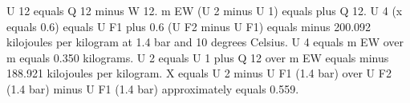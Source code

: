 U 12 equals Q 12 minus W 12. m EW (U 2 minus U 1) equals plus Q 12. U 4 (x equals 0.6) equals U F1 plus 0.6 (U F2 minus U F1) equals minus 200.092 kilojoules per kilogram at 1.4 bar and 10 degrees Celsius. U 4 equals m EW over m equals 0.350 kilograms. U 2 equals U 1 plus Q 12 over m EW equals minus 188.921 kilojoules per kilogram. X equals U 2 minus U F1 (1.4 bar) over U F2 (1.4 bar) minus U F1 (1.4 bar) approximately equals 0.559.